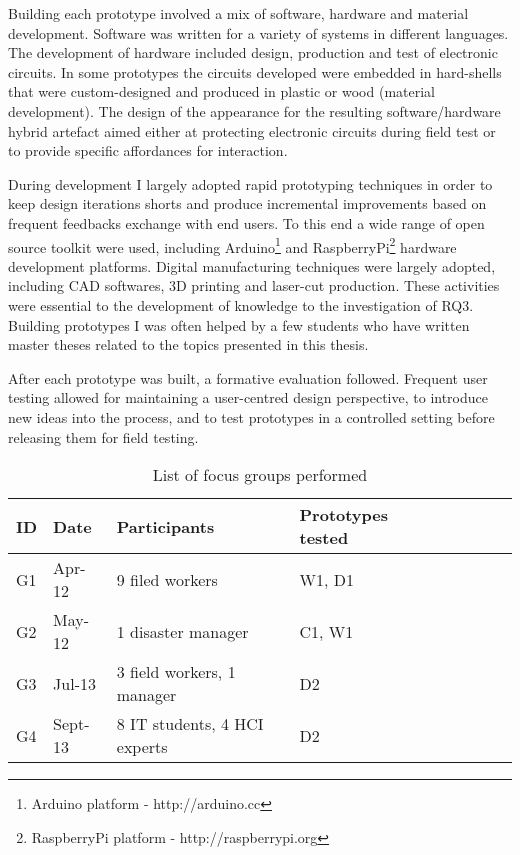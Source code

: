 Building each prototype involved a mix of software, hardware and material development. Software was written for a variety of systems in different languages. The development of hardware included design, production and test of electronic circuits. In some prototypes the circuits developed were embedded in hard-shells that were custom-designed and produced in plastic or wood (material development). The design of the appearance for the resulting software/hardware hybrid artefact aimed either at protecting electronic circuits during field test or to provide specific affordances for interaction.

During development I largely adopted rapid prototyping techniques in order to keep design iterations shorts and produce incremental improvements based on frequent feedbacks exchange with end users. To this end a wide range of open source toolkit were used, including Arduino\footnote{Arduino platform - http://arduino.cc} and RaspberryPi\footnote{RaspberryPi platform - http://raspberrypi.org} hardware development platforms. Digital manufacturing techniques were largely adopted, including CAD softwares, 3D printing and laser-cut production. These activities were essential to the development of knowledge to the investigation of RQ3. Building prototypes I was often helped by a few students who have written master theses related to the topics presented in this thesis.

After each prototype was built, a formative evaluation followed. Frequent user testing allowed for maintaining a user-centred design perspective, to introduce new ideas into the process, and to test prototypes in a controlled setting before releasing them for field testing.

\begin{table}
	[h] \centering \caption{List of focus groups performed} \label{labtests} 
	\begin{tabular}
		{@{}lllllllll@{}} \toprule 
		ID & Date & Participants & Prototypes tested \\
		\midrule 
		G1 & Apr-12 & 9 filed workers & W1, D1 \\
		G2 & May-12 & 1 disaster manager & C1, W1 \\
		G3 & Jul-13 & 3 field workers, 1 manager & D2 \\
		G4 & Sept-13 & 8 IT students, 4 HCI experts & D2 \\
		\bottomrule 
	\end{tabular}
\end{table}

